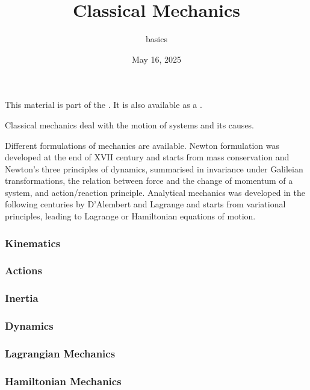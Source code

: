 \documentclass[letterpaper,10pt,english]{jupyterBook}
\title{Classical Mechanics}
\date{May 16, 2025}
\author{basics}
\begin{document}
\pagestyle{empty}
\sphinxmaketitle
\pagestyle{plain}
\sphinxtableofcontents
\pagestyle{normal}
\label{\detokenize{intro::doc}}


\sphinxAtStartPar
This material is part of the . It is also available as a .

\sphinxAtStartPar
Classical mechanics deal with the motion of systems and its causes.

\sphinxAtStartPar
Different formulations of mechanics are available. Newton formulation was developed at the end of XVII century and starts from mass conservation and Newton’s three principles of dynamics, summarised in invariance under Galileian transformations, the relation between force and the change of momentum of a system, and action/reaction principle. Analytical mechanics was developed in the following centuries by D’Alembert and Lagrange and starts from variational principles, leading to Lagrange or Hamiltonian equations of motion.

\sphinxAtStartPar
{}
\subsubsection*{Kinematics}
\subsubsection*{Actions}
\subsubsection*{Inertia}
\subsubsection*{Dynamics}

\sphinxAtStartPar
{}
\subsubsection*{Lagrangian Mechanics}
\subsubsection*{Hamiltonian Mechanics}
\end{document}
